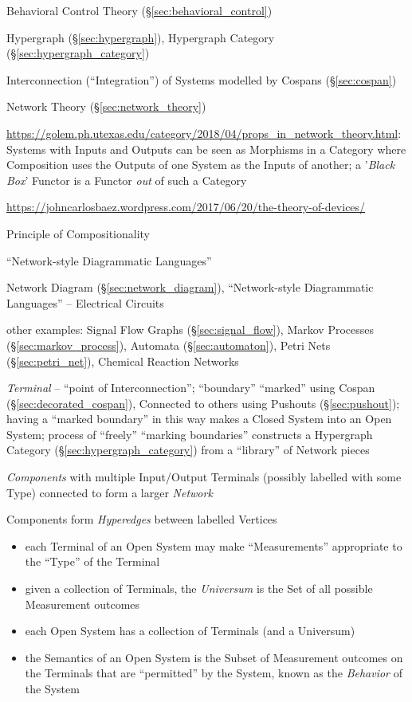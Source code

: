\fist Behavioral Control Theory (\S\ref{sec:behavioral_control})

\fist Hypergraph (\S\ref{sec:hypergraph}), Hypergraph Category
(\S\ref{sec:hypergraph_category})

Interconnection (``Integration'') of Systems modelled by Cospans
(\S\ref{sec:cospan})

\fist Network Theory (\S\ref{sec:network_theory})

\url{https://golem.ph.utexas.edu/category/2018/04/props_in_network_theory.html}:
Systems with Inputs and Outputs can be seen as Morphisms in a Category where
Composition uses the Outputs of one System as the Inputs of another; a
'\emph{Black Box}' Functor is a Functor \emph{out} of such a Category

\url{https://johncarlosbaez.wordpress.com/2017/06/20/the-theory-of-devices/}

Principle of Compositionality

``Network-style Diagrammatic Languages''

Network Diagram (\S\ref{sec:network_diagram}), ``Network-style
Diagrammatic Languages'' -- Electrical Circuits

other examples: Signal Flow Graphs (\S\ref{sec:signal_flow}),
Markov Processes (\S\ref{sec:markov_process}), Automata
(\S\ref{sec:automaton}), Petri Nets (\S\ref{sec:petri_net}), Chemical
Reaction Networks

\emph{Terminal} -- ``point of Interconnection''; ``boundary''
``marked'' using Cospan (\S\ref{sec:decorated_cospan}), Connected to
others using Pushouts (\S\ref{sec:pushout}); having a ``marked
boundary'' in this way makes a Closed System into an Open System;
process of ``freely''  ``marking boundaries'' constructs a Hypergraph
Category (\S\ref{sec:hypergraph_category}) from a ``library'' of
Network pieces

\emph{Components} with multiple Input/Output Terminals (possibly
labelled with some Type) connected to form a larger \emph{Network}

Components form \emph{Hyperedges} between labelled Vertices

\begin{itemize}
  \item each Terminal of an Open System may make ``Measurements''
    appropriate to the ``Type'' of the Terminal
  \item given a collection of Terminals, the \emph{Universum} is the
    Set of all possible Measurement outcomes
  \item each Open System has a collection of Terminals (and a Universum)
  \item the Semantics of an Open System is the Subset of Measurement
    outcomes on the Terminals that are ``permitted'' by the System,
    known as the \emph{Behavior} of the System
\end{itemize}

